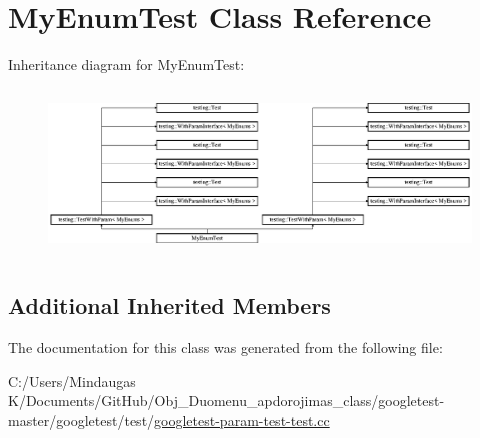 \hypertarget{class_my_enum_test}{}\section{My\+Enum\+Test Class Reference}
\label{class_my_enum_test}
Inheritance diagram for My\+Enum\+Test\+:\begin{figure}[H]
\begin{center}
\leavevmode
\includegraphics[height=4.462152cm]{dd/d62/class_my_enum_test}
\end{center}
\end{figure}
\subsection*{Additional Inherited Members}


The documentation for this class was generated from the following file\+:\begin{DoxyCompactItemize}
\item 
C\+:/\+Users/\+Mindaugas K/\+Documents/\+Git\+Hub/\+Obj\+\_\+\+Duomenu\+\_\+apdorojimas\+\_\+class/googletest-\/master/googletest/test/\mbox{\hyperlink{googletest-master_2googletest_2test_2googletest-param-test-test_8cc}{googletest-\/param-\/test-\/test.\+cc}}\end{DoxyCompactItemize}
